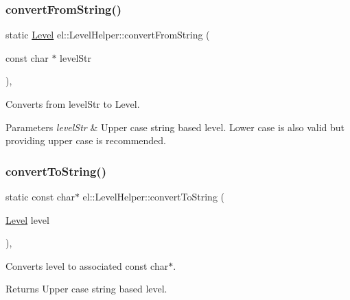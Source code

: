 \subsubsection{\texorpdfstring{convert\+From\+String()}{convertFromString()}}
{\footnotesize\ttfamily static \hyperlink{namespaceel_ab0ac6091262344c52dd2d3ad099e8e36}{Level} el\+::\+Level\+Helper\+::convert\+From\+String (\begin{DoxyParamCaption}\item[{const char $\ast$}]{level\+Str }\end{DoxyParamCaption})\hspace{0.3cm}{\ttfamily [inline]}, {\ttfamily [static]}}



Converts from level\+Str to Level. 


\begin{DoxyParams}{Parameters}
{\em level\+Str} & Upper case string based level. Lower case is also valid but providing upper case is recommended. \\
\hline
\end{DoxyParams}
\mbox{\label{classel_1_1_level_helper_a53b3e226a09af6e87c2072c115b3ba1a}} 
\subsubsection{\texorpdfstring{convert\+To\+String()}{convertToString()}}
{\footnotesize\ttfamily static const char$\ast$ el\+::\+Level\+Helper\+::convert\+To\+String (\begin{DoxyParamCaption}\item[{\hyperlink{namespaceel_ab0ac6091262344c52dd2d3ad099e8e36}{Level}}]{level }\end{DoxyParamCaption})\hspace{0.3cm}{\ttfamily [inline]}, {\ttfamily [static]}}



Converts level to associated const char$\ast$. 

\begin{DoxyReturn}{Returns}
Upper case string based level. 
\end{DoxyReturn}
\mbox{\label{classel_1_1_level_helper_a94449b79778145f4c58fd1da6bcaf45d}} 
